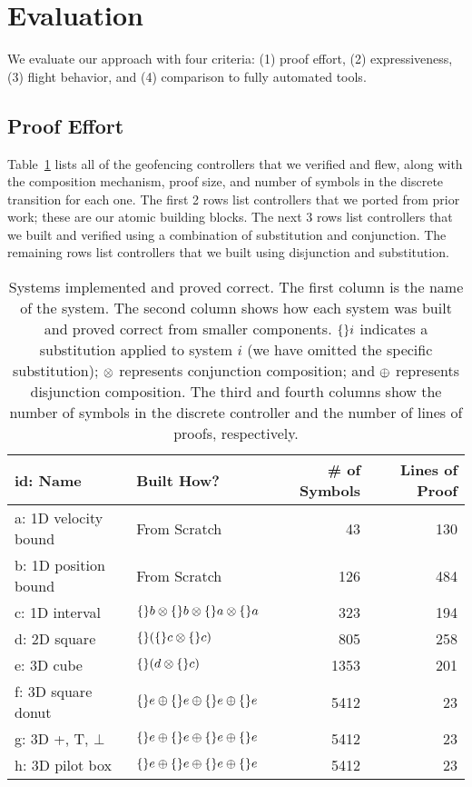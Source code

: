 \section{Evaluation}
\label{sec:eval}
We evaluate our approach with four criteria: (1) proof effort, (2)
expressiveness, (3) flight behavior, and (4) comparison to fully automated
tools.

\subsection{Proof Effort}
Table~\ref{fig:monitors} lists all of the geofencing controllers that we
verified and flew, along with the composition mechanism, proof size, and
number of symbols in the discrete transition for each one.  The first 2
rows list controllers that we ported from prior work; these are our atomic
building blocks.  The next 3 rows list controllers that we built and
verified using a combination of substitution and conjunction.  The
remaining rows list controllers that we built using disjunction and
substitution.

\begin{table}
\begin{tabular}{l|l|r|r}
id: Name & Built How? & \# of Symbols & Lines of Proof \\
\hline 
a: 1D velocity bound & From Scratch & 43 & 130 \\
b: 1D position bound & From Scratch & 126 & 484 \\
c: 1D interval & $\{\}b \otimes \{\}b \otimes \{\}a \otimes \{\}a$ & 323 & 194 \\
d: 2D square & $\{\}(\{\}c \otimes \{\}c)$ & 805 & 258 \\
e: 3D cube & $\{\}(d \otimes \{\}c)$ & 1353 & 201 \\
f: 3D square donut & $\{\}e\oplus\{\}e\oplus\{\}e\oplus\{\}e$ & 5412 & 23 \\
g: 3D +, T, $\bot$ & $\{\}e\oplus\{\}e\oplus\{\}e\oplus\{\}e$ & 5412 & 23 \\
h: 3D pilot box & $\{\}e\oplus\{\}e\oplus\{\}e\oplus\{\}e$ & 5412 & 23 \\
\end{tabular}
\caption{Systems implemented and proved correct. The first column is the name of the system. The second column shows how each system was built and proved correct from smaller components. $\{\}i$ indicates a substitution applied to system $i$ (we have omitted the specific substitution); $\otimes$ represents conjunction composition; and $\oplus$ represents disjunction composition. The third and fourth columns show the number of symbols in the discrete controller and the number of lines of proofs, respectively.}
\label{fig:monitors}
\end{table}

